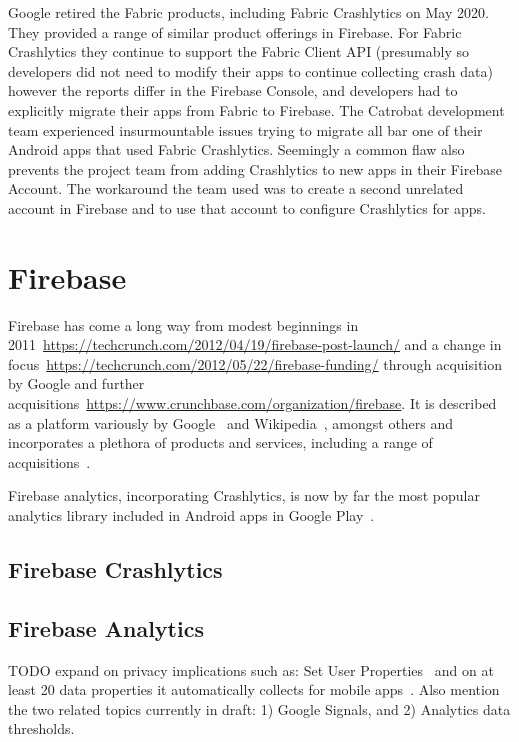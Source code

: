 Google retired the Fabric products, including Fabric Crashlytics on  May 2020. They provided a range of similar product offerings in Firebase. For Fabric Crashlytics they continue to support the Fabric Client API (presumably so developers did not need to modify their apps to continue collecting crash data) however the reports differ in the Firebase Console, and developers had to explicitly migrate their apps from Fabric to Firebase. The Catrobat development team experienced insurmountable issues trying to migrate all bar one of their Android apps that used Fabric Crashlytics. Seemingly a common flaw also prevents the project team from adding Crashlytics to new apps in their Firebase Account. The workaround the team used was to create a second unrelated account in Firebase and to use that account to configure Crashlytics for apps. %


\section{Firebase}
Firebase has come a long way from modest beginnings in 2011~\url{https://techcrunch.com/2012/04/19/firebase-post-launch/} and a change in focus~\url{https://techcrunch.com/2012/05/22/firebase-funding/} through acquisition by Google and further acquisitions~\url{https://www.crunchbase.com/organization/firebase}. It is described as a platform variously by Google~\citep{firebase_homepage_2021} and Wikipedia~\citep{wikipedia_firebase}, amongst others and incorporates a plethora of products and services, including a range of acquisitions~\citep{wikipedia_firebase}.

Firebase analytics, incorporating Crashlytics, is now by far the most popular analytics library included in Android apps in Google Play~\citep{appbrain_firebase}. 

\subsection{Firebase Crashlytics}

\subsection{Firebase Analytics}
TODO expand on privacy implications such as: Set User Properties~\citep{firebase_help_set_user_properties} and on at least 20 data properties it automatically collects for mobile apps~\citep{firebase_help_GA4_2021_predefined_user_dimensions}. Also mention the two related topics currently in draft: 1) Google Signals, and 2) Analytics data thresholds. 

